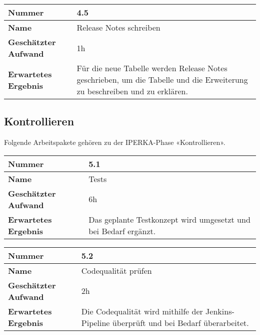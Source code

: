 \begin{longtable}{p{}|p{}}
	\hline
	\textbf{Nummer}                 & \textbf{4.5}            \\
	\hline
	\textbf{Name}   				& Release Notes schreiben                  \\
	\hline
	\textbf{Geschätzter Aufwand}    & 1h                                    \\
	\hline
	\textbf{Erwartetes Ergebnis}    & Für die neue Tabelle werden Release Notes geschrieben, um die Tabelle und die Erweiterung zu beschreiben und zu erklären.                                    \\
	\hline
\end{longtable}\label{tab:realisieren-4.5}

\subsection{Kontrollieren}
Folgende Arbeitspakete gehören zu der IPERKA-Phase «Kontrollieren».

\begin{longtable}{p{}|p{}}
	\hline
	\textbf{Nummer}                 & \textbf{5.1}            \\
	\hline
	\textbf{Name}   				& Tests                  \\
	\hline
	\textbf{Geschätzter Aufwand}    & 6h                                    \\
	\hline
	\textbf{Erwartetes Ergebnis}    & Das geplante Testkonzept wird umgesetzt und bei Bedarf ergänzt.                                    \\
	\hline
\end{longtable}\label{tab:kontrollieren-5.1}

\begin{longtable}{p{}|p{}}
	\hline
	\textbf{Nummer}                 & \textbf{5.2}            \\
	\hline
	\textbf{Name}   				& Codequalität prüfen                  \\
	\hline
	\textbf{Geschätzter Aufwand}    & 2h                                    \\
	\hline
	\textbf{Erwartetes Ergebnis}    & Die Codequalität wird mithilfe der Jenkins-Pipeline überprüft und bei Bedarf überarbeitet.                                    \\
	\hline
\end{longtable}\label{tab:kontrollieren-5.2}


